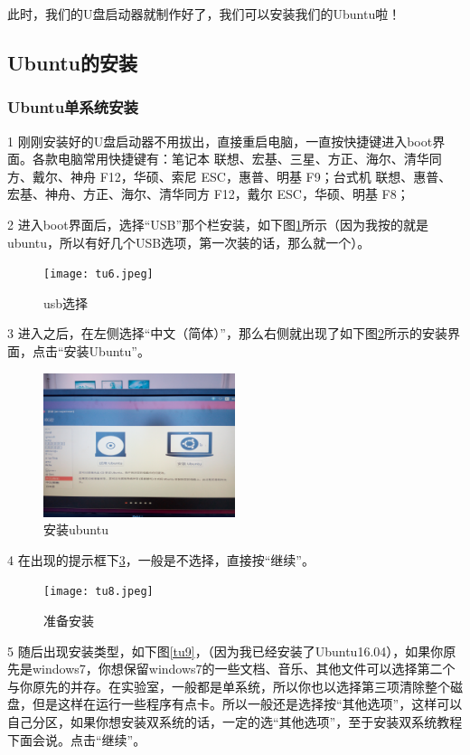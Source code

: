 \documentclass{article}
\begin{document}
此时，我们的U盘启动器就制作好了，我们可以安装我们的Ubuntu啦！

\subsection{Ubuntu的安装}

\subsubsection{Ubuntu单系统安装}

  1 刚刚安装好的U盘启动器不用拔出，直接重启电脑，一直按快捷键进入boot界面。各款电脑常用快捷键有：笔记本 联想、宏基、三星、方正、海尔、清华同方、戴尔、神舟 F12，华硕、索尼 ESC，惠普、明基 F9；台式机 联想、惠普、宏基、神舟、方正、海尔、清华同方 F12，戴尔 ESC，华硕、明基 F8；

  2 进入boot界面后，选择“USB”那个栏安装，如下图\ref{tu6}所示（因为我按的就是ubuntu，所以有好几个USB选项，第一次装的话，那么就一个）。

\begin{figure}[!htb] %
\centering
\texttt{[image: tu6.jpeg]}
\caption{\small usb选择}
\label{tu6}
\end{figure} 

  3 进入之后，在左侧选择“中文（简体）”，那么右侧就出现了如下图\ref{tu7}所示的安装界面，点击“安装Ubuntu”。

\begin{figure}[!htb] %
\centering
\includegraphics[width=0.5\textwidth]{tu7.jpeg}
\caption{\small 安装ubuntu}
\label{tu7}
\end{figure}
 
  4 在出现的提示框下\ref{tu8}，一般是不选择，直接按“继续”。

\begin{figure}[!htb] %
\centering
\texttt{[image: tu8.jpeg]}
\caption{\small 准备安装}
\label{tu8}
\end{figure} 

  5 随后出现安装类型，如下图\ref{tu9}，（因为我已经安装了Ubuntu16.04），如果你原先是windows7，你想保留windows7的一些文档、音乐、其他文件可以选择第二个与你原先的并存。在实验室，一般都是单系统，所以你也以选择第三项清除整个磁盘，但是这样在运行一些程序有点卡。所以一般还是选择按“其他选项”，这样可以自己分区，如果你想安装双系统的话，一定的选{\color{red}“其他选项”}，至于安装双系统教程下面会说。点击“继续”。
\end{document}
